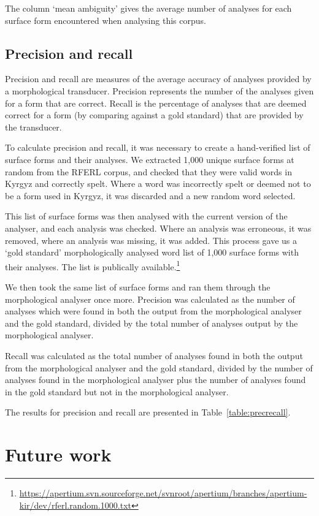 \documentclass[10pt,a4paper,twocolumn]{article}
\begin{document}
The column `mean ambiguity' gives the average number of analyses for each surface form encountered when analysing this corpus. 

\subsection{Precision and recall}

Precision and recall are measures of the average accuracy of analyses provided by a morphological transducer.  Precision represents the number of the analyses given for a form that are correct.  Recall is the percentage of analyses that are deemed correct for a form (by comparing against a gold standard) that are provided by the transducer.

To calculate precision and recall, it was necessary to create a hand-verified list of surface forms and their analyses. We extracted 1,000 unique surface forms at random from the RFERL corpus, and checked that they were valid words in Kyrgyz and correctly spelt.  Where a word was incorrectly spelt or deemed not to be a form used in Kyrgyz, it was discarded and a new random word selected.

This list of surface forms was then analysed with the current version of the analyser, and each analysis was checked. Where an analysis was erroneous, it was removed, where an analysis was missing, it was added. This process gave us a `gold standard' morphologically analysed word list of 1,000 surface forms with their analyses. The list is publically available.\footnote{\url{https://apertium.svn.sourceforge.net/svnroot/apertium/branches/apertium-kir/dev/rferl.random.1000.txt}}

We then took the same list of surface forms and ran them through the morphological analyser once more. Precision was calculated as the number of analyses which were found in both the output from the morphological analyser and the gold standard, divided by the total number of analyses output by the morphological analyser.

Recall was calculated as the total number of analyses found in both the output from the morphological analyser and the gold standard, divided by the number of analyses found in the morphological analyser plus the number of analyses found in the gold standard but not in the morphological analyser.

The results for precision and recall are presented in Table~\ref{table:precrecall}.

\section{Future work}
\end{document}
